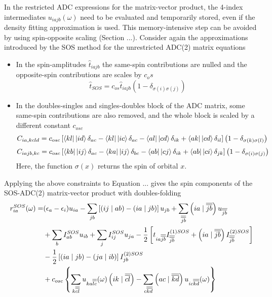 In the restricted ADC expressions for the matrix-vector product, the 4-index intermediates $u_{iajb}(\omega)$ need to be evaluated and temporarily stored, even if the density fitting approximation is used. This memory-intensive step can be avoided by using spin-opposite scaling (Section ...). Consider again the approximations introduced by the SOS method for the unrestricted ADC(2) matrix equations
\begin{itemize}
\item In the spin-amplitudes $\hat{t}_{iajb}$ the same-spin contributions are nulled and the opposite-spin contributions are scales by $c_os$
\begin{equation}
\hat{t}_{SOS} = c_{os} \hat{t}_{iajb} \left( 1 - \delta_{\sigma (i) \sigma (j)} \right)
\end{equation}
\item In the doubles-singles and singles-doubles block of the ADC matrix, some same-spin contributions are also removed, and the whole block is scaled by a different constant $c_{osc}$ 
\begin{equation}
C_{ia,kcld} = c_{osc} \left[ \bra{kl} {} \ket{id} \delta_{ac} - \bra{kl} {} \ket{ic} \delta_{ac} - \bra{al} {} \ket{cd} \delta_{ik} + \bra{ak} {} \ket{cd}\delta_{il} \right] \left( 1 - \delta_{\sigma (k) \sigma (l)} \right)
\end{equation}
\begin{equation}
C_{iajb,kc} = c_{osc} \left[ \bra{kb} {} \ket{ij} \delta_{ac} - \bra{ka} {} \ket{ij} \delta_{bc} - \bra{ab} {} \ket{cj} \delta_{ik} + \bra{ab} {} \ket{ci}\delta_{jk} \right] \left( 1 - \delta_{\sigma (i) \sigma (j)} \right)
\end{equation}
\noindent Here, the function $\sigma(x)$ returns the spin of orbital $x$.
\end{itemize}
Applying the above constraints to Equation ... gives the spin components of the SOS-ADC(2) matrix-vector product with doubles-folding 
\begin{equation}
\begin{split}
r_{ia}^{SOS}( \omega) = &(\epsilon_a - \epsilon_i) u_{ia} - \sum_{jb} \left[ \left( ij \mid ab \right) - \left( ia \mid jb \right) \right] u_{jb} + \sum_{\overline{\overline{jb}}} \left( ia \mid \overline{\overline{jb}} \right) u_{\overline{\overline{jb}}} \\
&+ \sum_b I^{SOS}_{ab} u_{ib} + \sum_{j} I^{SOS}_{ij} u_{ja} - \frac{1}{2} \left[ t_{ia\overline{\overline{jb}}} I^{(1)SOS}_{\overline{\overline{jb}}} + \left( ia \mid \overline{\overline{jb}} \right) I_{\overline{\overline{jb}}}^{(2)SOS} \right] \\
&- \frac{1}{2} \left[\left( ia \mid jb \right) - \left( ja \mid ib \right) \right] I_{jb}^{(2)SOS} \\
&+ c_{osc} \left\lbrace \sum_{k\overline{\overline{cl}}} u_{ka\overline{\overline{lc}}}(\omega) \left( ik \mid \overline{\overline{cl}} \right) - \sum_{c\overline{\overline{kd}}} \left( ac \mid \overline{\overline{kd}} \right) u_{ic\overline{\overline{kd}}}(\omega) \right\rbrace
\end{split}
\end{equation}  
